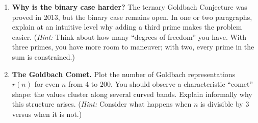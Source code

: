 \begin{enumerate}
    \item \textbf{Why is the binary case harder?}
    The ternary Goldbach Conjecture was proved in 2013, but the binary case remains open. In one or two paragraphs, explain at an intuitive level why adding a third prime makes the problem easier. (\emph{Hint:} Think about how many ``degrees of freedom'' you have. With three primes, you have more room to maneuver; with two, every prime in the sum is constrained.)

    \item[$\star$] \textbf{The Goldbach Comet.} Plot the number of Goldbach representations $r(n)$ for even $n$ from $4$ to $200$. You should observe a characteristic ``comet'' shape: the values cluster along several curved bands. Explain informally why this structure arises. (\emph{Hint:} Consider what happens when $n$ is divisible by 3 versus when it is not.)

\end{enumerate}
